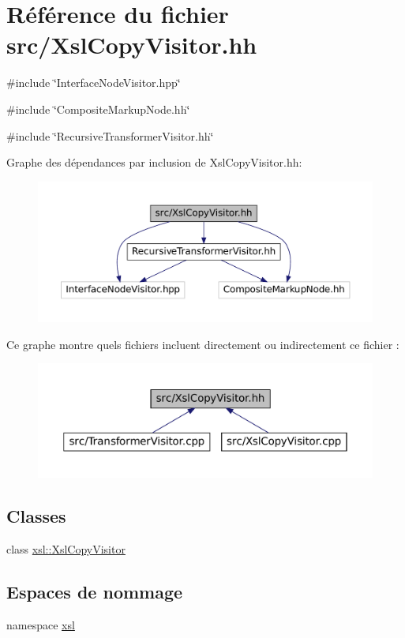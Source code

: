 \hypertarget{_xsl_copy_visitor_8hh}{
\section{Référence du fichier src/XslCopyVisitor.hh}
\label{_xsl_copy_visitor_8hh}
}
{\ttfamily \#include \char`\"{}InterfaceNodeVisitor.hpp\char`\"{}}\par
{\ttfamily \#include \char`\"{}CompositeMarkupNode.hh\char`\"{}}\par
{\ttfamily \#include \char`\"{}RecursiveTransformerVisitor.hh\char`\"{}}\par
Graphe des dépendances par inclusion de XslCopyVisitor.hh:\nopagebreak
\begin{figure}[H]
\begin{center}
\leavevmode
\includegraphics[width=400pt]{_xsl_copy_visitor_8hh__incl}
\end{center}
\end{figure}
Ce graphe montre quels fichiers incluent directement ou indirectement ce fichier :\nopagebreak
\begin{figure}[H]
\begin{center}
\leavevmode
\includegraphics[width=400pt]{_xsl_copy_visitor_8hh__dep__incl}
\end{center}
\end{figure}
\subsection*{Classes}
\begin{DoxyCompactItemize}
\item 
class \hyperlink{classxsl_1_1_xsl_copy_visitor}{xsl::XslCopyVisitor}
\end{DoxyCompactItemize}
\subsection*{Espaces de nommage}
\begin{DoxyCompactItemize}
\item 
namespace \hyperlink{namespacexsl}{xsl}
\end{DoxyCompactItemize}
